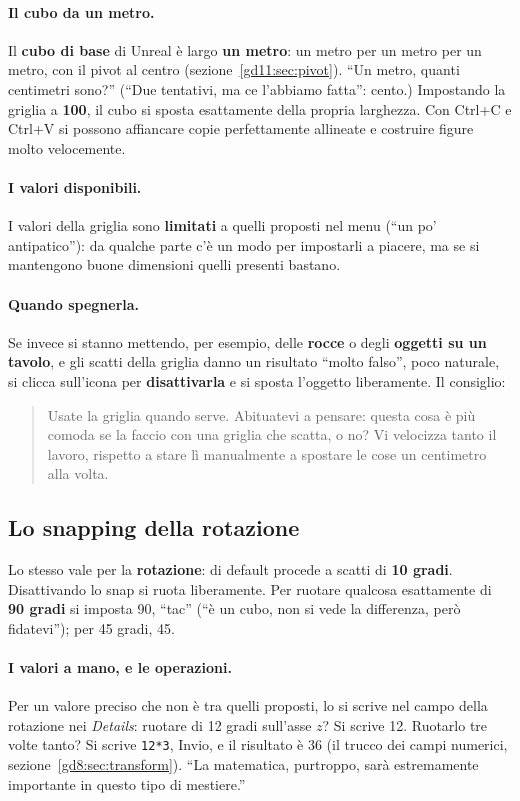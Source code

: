 \paragraph{Il cubo da un metro.} Il \textbf{cubo di base} di Unreal è largo
\textbf{un metro}: un metro per un metro per un metro, con il pivot al centro
(sezione~\ref{gd11:sec:pivot}). ``Un metro, quanti centimetri sono?'' (``Due
tentativi, ma ce l'abbiamo fatta'': cento.) Impostando la griglia a
\textbf{100}, il cubo si sposta esattamente della propria larghezza. Con
Ctrl+C e Ctrl+V si possono affiancare copie perfettamente allineate e costruire
figure molto velocemente.

\paragraph{I valori disponibili.} I valori della griglia sono \textbf{limitati}
a quelli proposti nel menu (``un po' antipatico''): da qualche parte c'è un modo
per impostarli a piacere, ma se si mantengono buone dimensioni quelli presenti
bastano.

\paragraph{Quando spegnerla.} Se invece si stanno mettendo, per esempio, delle
\textbf{rocce} o degli \textbf{oggetti su un tavolo}, e gli scatti della griglia
danno un risultato ``molto falso'', poco naturale, si clicca sull'icona per
\textbf{disattivarla} e si sposta l'oggetto liberamente. Il consiglio:
\begin{quote}
Usate la griglia quando serve. Abituatevi a pensare: questa cosa è più comoda se
la faccio con una griglia che scatta, o no? Vi velocizza tanto il lavoro,
rispetto a stare lì manualmente a spostare le cose un centimetro alla volta.
\end{quote}

\subsection{Lo snapping della rotazione}

Lo stesso vale per la \textbf{rotazione}: di default procede a scatti di
\textbf{10 gradi}. Disattivando lo snap si ruota liberamente. Per ruotare
qualcosa esattamente di \textbf{90 gradi} si imposta 90, ``tac'' (``è un cubo,
non si vede la differenza, però fidatevi''); per 45 gradi, 45.

\paragraph{I valori a mano, e le operazioni.} Per un valore preciso che non è
tra quelli proposti, lo si scrive nel campo della rotazione nei
\emph{Details}: ruotare di 12 gradi sull'asse $z$? Si scrive 12. Ruotarlo tre
volte tanto? Si scrive \texttt{12*3}, Invio, e il risultato è 36 (il trucco dei
campi numerici, sezione~\ref{gd8:sec:transform}). ``La matematica, purtroppo,
sarà estremamente importante in questo tipo di mestiere.''

